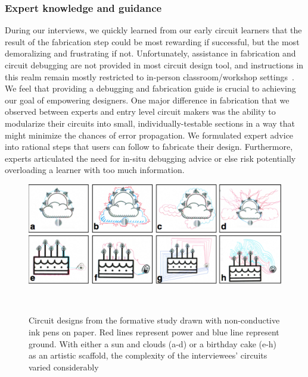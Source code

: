 \documentclass{sigchi}
\begin{document}
\subsubsection{Expert knowledge and guidance}
During our interviews, we quickly learned from our early circuit learners that the result of the fabrication step could be most rewarding if successful, but the most demoralizing and frustrating if not. Unfortunately, assistance in fabrication and circuit debugging are not provided in most circuit design tool, and instructions in this realm remain mostly restricted to in-person classroom/workshop settings~\cite{Klemmer:2004ul}. We feel that providing a debugging and fabrication guide is crucial to achieving our goal of empowering designers. One major difference in fabrication that we observed between experts and entry level circuit makers was the ability to modularize their circuits into small, individually-testable sections in a way that might minimize the chances of error propagation. We formulated expert advice into rational steps that users can follow to fabricate their design. Furthermore, experts articulated the need for in-situ debugging advice or else risk potentially overloading a learner with too much information. 



\begin{figure}
\centering
  \includegraphics[width=1\columnwidth]{figures/Ellustrate_figures_formative_user_design}
  \caption{Circuit designs from the formative study drawn with non-conductive ink pens on paper. Red lines represent power and blue line represent ground. With either a sun and clouds (a-d) or a birthday cake (e-h) as an artistic scaffold, the complexity of the interviewees' circuits varied considerably }~\label{fig:formative_user_design}
  \vspace{-20pt}
\end{figure}
\newpage
\end{document}
